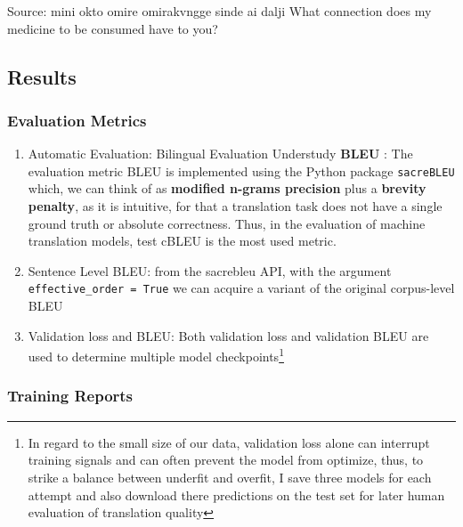 \documentclass[
  letterpaper,
  DIV=11,
  numbers=noendperiod]{scrartcl}
\newenvironment{Shaded}{\begin{snugshade}}{\end{snugshade}}
\newcommand{\NormalTok}[1]{\textcolor[rgb]{0.00,0.23,0.31}{#1}}
\newcommand{\SpecialCharTok}[1]{\textcolor[rgb]{0.37,0.37,0.37}{#1}}
\begin{document}
\begin{Shaded}
\begin{Highlighting}[]
\NormalTok{Source}\SpecialCharTok{:}\NormalTok{ mini okto omire omirakvngge sinde ai dalji}
\NormalTok{What connection does my medicine to be consumed have to you?}
\end{Highlighting}
\end{Shaded}

\subsection{Results}\label{results}

\subsubsection{Evaluation Metrics}\label{evaluation-metrics}

\begin{enumerate}
\def\labelenumi{\arabic{enumi}.}
\item
  Automatic Evaluation: Bilingual Evaluation Understudy \textbf{BLEU} :
  The evaluation metric BLEU is implemented using the Python package
  \texttt{sacreBLEU} which, we can think of as \textbf{modified n-grams
  precision} plus a \textbf{brevity penalty}, as it is intuitive, for
  that a translation task does not have a single ground truth or
  absolute correctness. Thus, in the evaluation of machine translation
  models, test cBLEU is the most used metric.
\item
  Sentence Level BLEU: from the sacrebleu API, with the argument
  \texttt{effective\_order\ =\ True} we can acquire a variant of the
  original corpus-level BLEU
\item
  Validation loss and BLEU: Both validation loss and validation BLEU are
  used to determine multiple model checkpoints\footnote{In regard to the
    small size of our data, validation loss alone can interrupt training
    signals and can often prevent the model from optimize, thus, to
    strike a balance between underfit and overfit, I save three models
    for each attempt and also download there predictions on the test set
    for later human evaluation of translation quality}
\end{enumerate}

\subsubsection{Training Reports}\label{training-reports}
\end{document}
